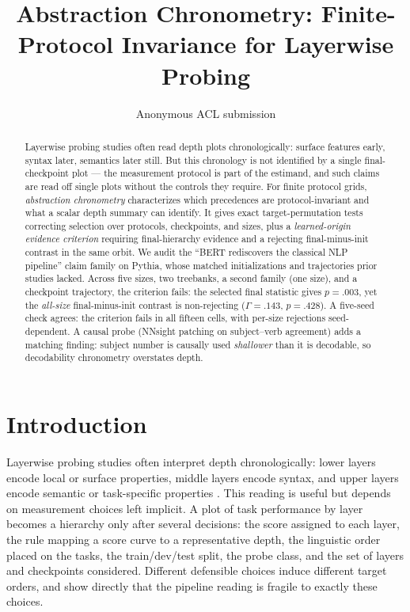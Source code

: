 \documentclass[11pt]{article}
\title{Abstraction Chronometry: Finite-Protocol Invariance for Layerwise Probing}
\author{Anonymous ACL submission}
\begin{document}
\maketitle

\begin{abstract}
Layerwise probing studies often read depth plots chronologically: surface features early, syntax later, semantics later still. But this chronology is not identified by a single final-checkpoint plot --- the measurement protocol is part of the estimand, and such claims are read off single plots without the controls they require. For finite protocol grids, \emph{abstraction chronometry} characterizes which precedences are protocol-invariant and what a scalar depth summary can identify. It gives exact target-permutation tests correcting selection over protocols, checkpoints, and sizes, plus a \emph{learned-origin evidence criterion} requiring final-hierarchy evidence and a rejecting final-minus-init contrast in the same orbit. We audit the ``BERT rediscovers the classical NLP pipeline'' claim family on Pythia, whose matched initializations and trajectories prior studies lacked. Across five sizes, two treebanks, a second family (one size), and a checkpoint trajectory, the criterion fails: the selected final statistic gives $p=.003$, yet the \emph{all-size} final-minus-init contrast is non-rejecting ($\Gamma=.143$, $p=.428$). A five-seed check agrees: the criterion fails in all fifteen cells, with per-size rejections seed-dependent. A causal probe (NNsight patching on subject--verb agreement) adds a matching finding: subject number is causally used \emph{shallower} than it is decodable, so decodability chronometry overstates depth.
\end{abstract}

\section{Introduction}
\label{sec:intro}

Layerwise probing studies often interpret depth chronologically: lower layers encode local or surface properties, middle layers encode syntax, and upper layers encode semantic or task-specific properties \citep{tenney2019bert,jawahar2019bert,rogers2020primer}. This reading is useful but depends on measurement choices left implicit. A plot of task performance by layer becomes a hierarchy only after several decisions: the score assigned to each layer, the rule mapping a score curve to a representative depth, the linguistic order placed on the tasks, the train/dev/test split, the probe class, and the set of layers and checkpoints considered. Different defensible choices induce different target orders, and \citet{niu2022doesbert} show directly that the pipeline reading is fragile to exactly these choices.
\end{document}
